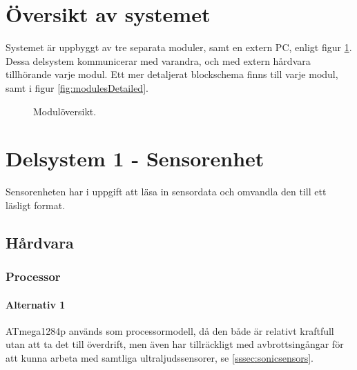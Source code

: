 \documentclass[a4paper,11pt]{article}
\begin{document}
\newpage
\section{Översikt av systemet}
Systemet är uppbyggt av tre separata moduler, samt en extern PC, enligt figur \ref{fig:modules}. Dessa delsystem kommunicerar med varandra, och med extern hårdvara tillhörande varje modul. Ett mer detaljerat blockschema finns till varje modul, samt i figur \ref{fig:modulesDetailed}.
\begin{figure}[h!]
    \caption{Modulöversikt.}
    \label{fig:modules}
\end{figure}

\section{Delsystem 1 - Sensorenhet}

Sensorenheten har i uppgift att läsa in sensordata och omvandla den till ett läsligt format.

\subsection{Hårdvara}

\subsubsection{Processor} %

\paragraph{Alternativ 1} %
ATmega1284p används som processormodell, då den både är relativt kraftfull utan att ta det till överdrift, men även har tillräckligt med avbrottsingångar för att kunna arbeta med samtliga ultraljudssensorer, se \ref{sssec:sonicsensors}.
\end{document}
